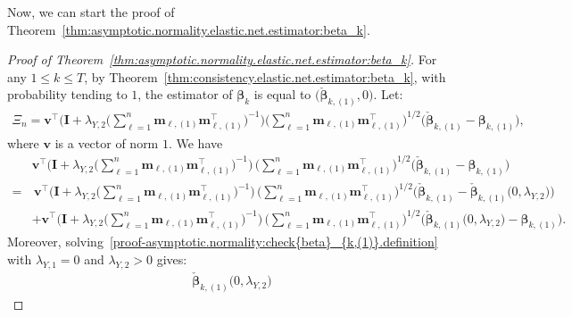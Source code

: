 \documentclass[
  12pt]{article}
\def\M{\mathbf{m}}
\begin{document}
\medskip

Now, we can start the proof of  Theorem~\ref{thm:asymptotic.normality.elastic.net.estimator:beta_k}. 
\begin{proof}[Proof of Theorem~\ref{thm:asymptotic.normality.elastic.net.estimator:beta_k}]
	For any $1 \leq k \leq T$, by Theorem~\ref{thm:consistency.elastic.net.estimator:beta_k}, with probability tending to $1$, the estimator of $\bm{\beta}_{k}$ is equal to $\Big( \check{\bm{\beta}}_{k,(1)} , 0  \Big)$.   
	Let:  
	\begin{align*}
		\Xi_{n} = \mathbf{v}^{\top} \Big( \mathbf{I} + \lambda_{Y,2}  \big( \sum_{\ell = 1}^{n} \M_{\ell,(1)}  \M_{\ell,(1)}^{\top} \big)^{-1}  \Big)  
		\Big( \sum_{\ell = 1}^{n} \M_{\ell,(1)}  \M_{\ell,(1)}^{\top} \Big)^{1/2}  \Big( \check{\bm{\beta}}_{k,(1)} - \bm{\beta}_{k,(1)} \Big)  ,     
	\end{align*}
	where $\mathbf{v}$ is a vector of norm $1$. 
	We have  
	\begin{align*}
		&\mathbf{v}^{\top}  \Big(  \mathbf{I} + \lambda_{Y,2} \big(  \sum_{\ell = 1}^{n} \M_{\ell,(1)}  \M_{\ell,(1)}^{\top} \big)^{-1} \Big) \, 
		\Big( \sum_{\ell = 1}^{n} \M_{\ell,(1)}  \M_{\ell,(1)}^{\top} \Big)^{1/2}  \Big( \check{\bm{\beta}}_{k,(1)} - \bm{\beta}_{k,(1)} \Big)  
		\\
		=& \,  \mathbf{v}^{\top}  \Big( \mathbf{I} + \lambda_{Y,2} \big(  \sum_{\ell = 1}^{n} \M_{\ell,(1)}  \M_{\ell,(1)}^{\top} \big)^{-1}  \Big) \,      
		\Big( \sum_{\ell = 1}^{n} \M_{\ell,(1)}  \M_{\ell,(1)}^{\top} \Big)^{1/2}  \Big( \check{\bm{\beta}}_{k,(1)} -  \check{\bm{\beta}}_{k,(1)} \big( 0 , \lambda_{Y,2} \big)  \Big) 
		\\
		& + \mathbf{v}^{\top}  \Big( \mathbf{I} + \lambda_{Y,2} \big( \sum_{\ell = 1}^{n} \M_{\ell,(1)}  \M_{\ell,(1)}^{\top} \big)^{-1}  \Big) \,      
		\Big( \sum_{\ell = 1}^{n} \M_{\ell,(1)}  \M_{\ell,(1)}^{\top} \Big)^{1/2}  \Big(  \check{\bm{\beta}}_{k,(1)} \big( 0 , \lambda_{Y,2} \big)  -  \bm{\beta}_{k, (1)} \Big) .
	\end{align*}
	Moreover, solving~\eqref{proof-asymptotic.normality:check{beta}_{k,(1)}.definition} with $\lambda_{Y,1} = 0$ and $\lambda_{Y,2} > 0$ gives:   
	\begin{align*}
		\check{\bm{\beta}}_{k,(1)} \big( 0 , \lambda_{Y,2} \big)

\end{align*}
\end{proof}
\end{document}
